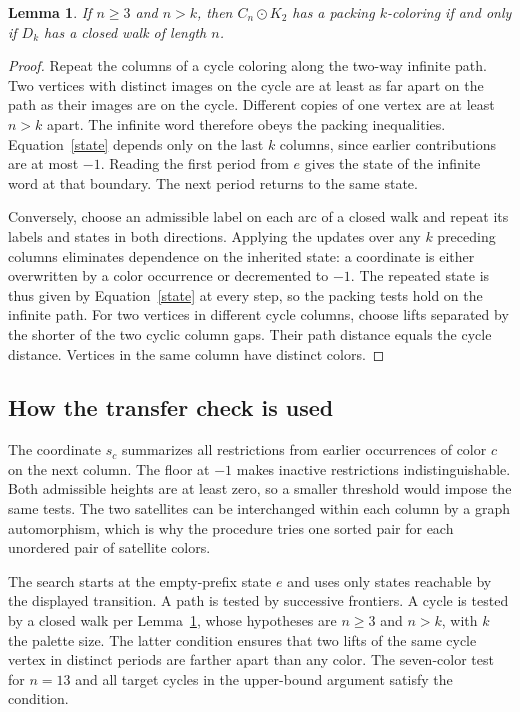 \documentclass[11pt]{article}
\newtheorem{lemma}[theorem]{Lemma}
\begin{document}
\begin{lemma}\label{cyclic}
If \(n\ge3\) and \(n>k\), then \(C_n\odot K_2\) has a packing
\(k\)-coloring if and only if \(D_k\) has a closed walk of length \(n\).
\end{lemma}
\begin{proof}
Repeat the columns of a cycle coloring along the two-way infinite path.
Two vertices with distinct images on the cycle are at least as far apart
on the path as their images are on the cycle. Different copies of one
vertex are at least \(n>k\) apart. The infinite word therefore obeys the
packing inequalities. Equation~\eqref{state} depends only on the last
\(k\) columns, since earlier contributions are at most \(-1\). Reading
the first period from \(e\) gives the state of the infinite word at that
boundary. The next period returns to the same state.

Conversely, choose an admissible label on each arc of a closed walk
and repeat its labels and states in both directions. Applying the updates
over any \(k\) preceding columns eliminates dependence on the inherited
state: a coordinate is either overwritten by a color occurrence or
decremented to \(-1\). The repeated state is thus given by
Equation~\eqref{state} at every step, so the packing tests hold on the
infinite path. For two vertices in different cycle columns, choose lifts
separated by the shorter of the two cyclic column gaps. Their path
distance equals the cycle distance. Vertices in the same column have
distinct colors.
\end{proof}

\subsection{How the transfer check is used}
The coordinate \(s_c\) summarizes all restrictions from earlier
occurrences of color \(c\) on the next column. The floor at \(-1\) makes
inactive restrictions indistinguishable. Both admissible heights are
at least zero, so a smaller threshold would impose the same tests.
The two satellites can be interchanged within each column by a graph
automorphism, which is why the procedure tries one sorted pair for
each unordered pair of satellite colors.

The search starts at the empty-prefix state \(e\) and uses only states
reachable by the displayed transition. A path is tested by successive
frontiers. A cycle is tested by a closed walk per Lemma~\ref{cyclic},
whose hypotheses are \(n\ge3\) and \(n>k\), with \(k\) the palette size.
The latter condition ensures that two lifts of the same cycle vertex
in distinct periods are farther apart than any color. The seven-color
test for \(n=13\) and all target cycles in the upper-bound argument
satisfy the condition.
\end{document}
